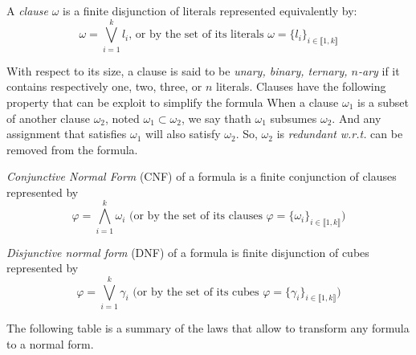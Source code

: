 \begin{definition}[Clause]
A \emph{clause} $\omega$ is a finite disjunction of literals represented equivalently by:
$$\omega = \bigvee_{i=1}^k l_i \text{, or by the set of its literals } \omega = \{l_i\}_{i \in \llbracket 1,k \rrbracket}$$
\end{definition}

With respect to its size, a clause is said to be \emph{unary, binary, ternary, $n$-ary} if it contains respectively one, two, three, or $n$ literals.
Clauses have the following property that can be exploit to simplify the formula
When a clause $\omega_1$ is a subset of another clause $\omega_2$, noted $\omega_1 \subset \omega_2$,
we say thath $\omega_{1}$ subsumes $\omega_{2}$.
 And any assignment that satisfies $\omega_1$ will also satisfy $\omega_2$. So, $\omega_2$ is \emph{redundant} \textit{w.r.t.}  can be removed from the formula.


\begin{definition}
	\emph{Conjunctive Normal Form} (CNF) of a formula is a finite conjunction of clauses represented by
	$$\varphi = \bigwedge_{i=1}^k \omega_i \text{ (or by the set of its clauses } \varphi = \{\omega_i\}_{i \in \llbracket 1,k \rrbracket}\text{)}$$
\end{definition}
  
  
 \begin{definition}
\emph{Disjunctive normal form} (DNF) of a formula is finite disjunction of cubes represented by
$$\varphi = \bigvee_{i=1}^k \gamma_i \text{ (or by the set of its cubes } \varphi = \{\gamma_i\}_{i \in \llbracket 1,k \rrbracket}\text{)}$$
 \end{definition}

The following table is a summary of the laws that allow to transform any formula to
a normal form.

